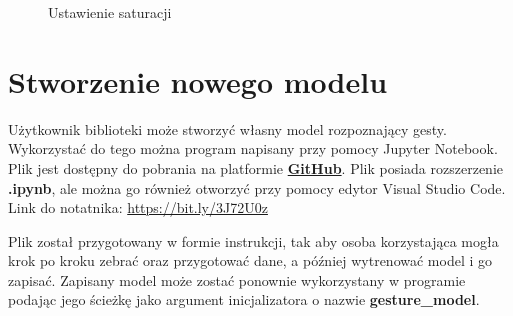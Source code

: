 \begin{figure}[H]
    \centering
    \hfill
    \caption{Ustawienie saturacji}
\end{figure}


\section{Stworzenie nowego modelu}
\label{ext:new_model}

\quad Użytkownik biblioteki może stworzyć własny model rozpoznający gesty. Wykorzystać do tego można program napisany przy pomocy Jupyter Notebook. Plik jest dostępny do pobrania na platformie \href{https://bit.ly/3J72U0z}{\textbf{GitHub}}. Plik posiada rozszerzenie \textbf{.ipynb}, ale można go również otworzyć przy pomocy edytor Visual Studio Code. Link do notatnika: \href{https://bit.ly/3J72U0z}{https://bit.ly/3J72U0z}

\quad Plik został przygotowany w formie instrukcji, tak aby osoba korzystająca mogła krok po kroku zebrać oraz przygotować dane, a później wytrenować model i go zapisać. Zapisany model może zostać ponownie wykorzystany w programie podając jego ścieżkę jako argument inicjalizatora o nazwie \textbf{gesture\_model}.

